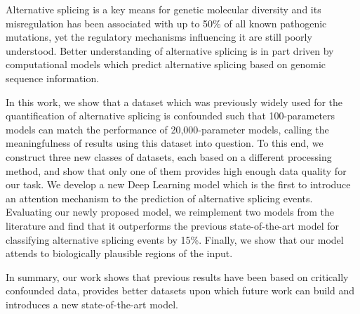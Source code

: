 
Alternative splicing is a key means for genetic molecular diversity
and its misregulation has been associated with up to 50\% of all known pathogenic mutations, yet the regulatory mechanisms influencing it are still poorly understood. Better understanding of alternative splicing is in part driven by computational models which predict alternative splicing based on genomic sequence information. 

In this work, we show that a dataset which was previously widely used for the quantification of alternative splicing is confounded such that 100-parameters models can match the performance of 20,000-parameter models, calling the meaningfulness of results using this dataset into question. To this end, we construct three new classes of datasets, each based on a different processing method, and show that only one of them provides high enough data quality for our task. We develop a new Deep Learning model which is the first to introduce an attention mechanism to the prediction of alternative splicing events. Evaluating our newly proposed model, we reimplement two models from the literature and find that it outperforms the previous state-of-the-art model for classifying alternative splicing events by 15\%. %
Finally, we show that our model attends to biologically plausible regions of the input. 


In summary, our work shows that previous results have been based on critically confounded data,
provides better datasets upon which future work can build and introduces a new state-of-the-art model. 


